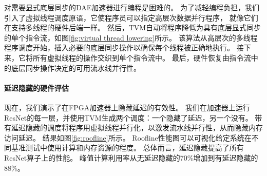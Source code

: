 对需要显式底层同步的DAE加速器进行编程是困难的。
为了减轻编程负担，我们引入了虚拟线程调度原语，它使程序员可以指定高层次数据并行程序，
就像它们在支持多线程的硬件后端一样。
然后，TVM自动将程序降低为具有底层显式同步的单个指令流，如图\ref{fig:virtual thread lowering}所示。
该算法从高层次的多线程程序调度开始，插入必要的底层同步操作以确保每个线程被正确地执行。
接下来，它将所有虚拟线程的操作交织到单个指令流中。
最后，硬件恢复由指令流中的底层同步操作决定的可用流水线并行性。

\paragraph{延迟隐藏的硬件评估}
现在，我们演示了在FPGA加速器上隐藏延迟的有效性。
我们在加速器上运行ResNet的每一层，并使用TVM生成两个调度：一个隐藏了延迟，另一个没有。
带有延迟隐藏的调度将程序用虚拟线程并行化，以激发流水线并行性，从而隐藏内存访问延迟。
结果如图\ref{fig:roofline}所示。
Roofline性能图可以可视化给定系统在不同基准测试中使用计算和内存资源的程度。
总体而言，延迟隐藏提高了所有ResNet算子上的性能。
峰值计算利用率从无延迟隐藏的70\%增加到有延迟隐藏的88\%。
